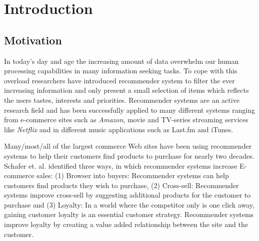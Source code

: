 
\chapter{Introduction}
\minitoc
\setcounter{page}{1}

\clearpage

\section{Motivation}

In today's day and age the increasing amount of data overwhelm our human processing capabilities in many information seeking tasks. To cope with this overload researchers have introduced recommender system to filter the ever increasing information and only present a small selection of items which reflects the users tastes, interests and priorities.  Recommender systems are an active research field and has been successfully applied to many different systems ranging from e-commerce sites such as \emph{Amazon}, movie and TV-series streaming services like \emph{Netflix} and in different music applications such as {Last.fm} and {iTunes}.

Many/most/all of the largest commerce Web sites have been using recommender systems to help their customers find products to purchase for nearly two decades.
Schafer et. al. \cite{Schafer1999} identified three ways, in which recommender systems increase E-commerce sales: (1) Browser into buyers: Recommender systems can help customers find products they wish to purchase, (2) Cross-sell: Recommender systems improve cross-sell by suggesting additional products for the customer to purchase and (3) Loyalty: In a world where the competitor only is one click away, gaining customer loyalty is an essential customer strategy. Recommender systems improve loyalty by creating a value added relationship between the site and the customer.

